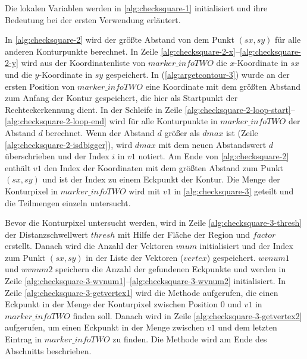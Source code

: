 

Die lokalen Variablen werden in \autoref{alg:checksquare-1} initialisiert und ihre Bedeutung bei der ersten Verwendung erläutert.



In \autoref{alg:checksquare-2} wird der größte Abstand von dem Punkt $(\mathit{sx},\mathit{sy})$ für alle anderen
 Konturpunkte berechnet. In Zeile \ref{alg:checksquare-2-x}--\ref{alg:checksquare-2-y} wird aus der Koordinatenliste
 von $\mathit{marker\_infoTWO}$ die $x$-Koordinate in $\mathit{sx}$ und die $y$-Koordinate in $\mathit{sy}$
 gespeichert. In  (\autoref{alg:argetcontour-3}) wurde an der ersten Position von
 $\mathit{marker\_infoTWO}$ eine Koordinate mit dem größten Abstand zum Anfang der Kontur gespeichert, die hier als
 Startpunkt der Rechteckerkennung dient. In der Schleife in Zeile
 \ref{alg:checksquare-2-loop-start}--\ref{alg:checksquare-2-loop-end} wird für alle Konturpunkte in
 $\mathit{marker\_infoTWO}$ der Abstand $d$ berechnet. Wenn der Abstand $d$ größer als $\mathit{dmax}$ ist (Zeile
 \ref{alg:checksquare-2-isdbigger}), wird $\mathit{dmax}$ mit dem neuen Abstandswert $d$ überschrieben und der Index
 $i$ in $\mathit{v1}$ notiert. Am Ende von \autoref{alg:checksquare-2} enthält $\mathit{v1}$ den Index der Koordinaten
 mit dem größten Abstand zum Punkt $(\mathit{sx},\mathit{sy})$ und ist der Index zu einem Eckpunkt der Kontur. Die
 Menge der Konturpixel in $\mathit{marker\_infoTWO}$ wird mit $\mathit{v1}$ in \autoref{alg:checksquare-3} geteilt und
 die Teilmengen einzeln untersucht.



Bevor die Konturpixel untersucht werden, wird in Zeile \ref{alg:checksquare-3-thresh} der Distanzschwellwert
 $\mathit{thresh}$ mit Hilfe der Fläche der Region und $\mathit{factor}$ erstellt. Danach wird die Anzahl der Vektoren
 $\mathit{vnum}$ initialisiert und der Index zum Punkt $(\mathit{sx}, \mathit{sy})$ in der Liste der Vektoren
 ($\mathit{vertex}$) gespeichert. $wvnum1$ und $wvnum2$ speichern die Anzahl der gefundenen Eckpunkte und werden in
 Zeile \ref{alg:checksquare-3-wvnum1}--\ref{alg:checksquare-3-wvnum2} initialisiert. In Zeile
 \ref{alg:checksquare-3-getvertex1} wird die Methode  aufgerufen, die einen Eckpunkt in der Menge
 der Konturpixel zwischen Position $0$ und $\mathit{v1}$ in $\mathit{marker\_infoTWO}$ finden soll. Danach wird
  in Zeile \ref{alg:checksquare-3-getvertex2} aufgerufen, um einen Eckpunkt in der Menge zwischen
 $\mathit{v1}$ und dem letzten Eintrag in $\mathit{marker\_infoTWO}$ zu finden. Die Methode  wird
 am Ende des Abschnitts beschrieben.

